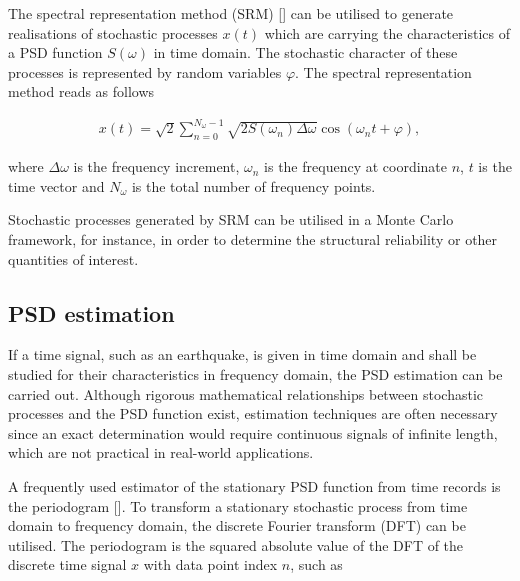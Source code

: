 \label{15268098057762990786}{}


The spectral representation method (SRM) [] can be utilised to generate realisations of stochastic processes \(x(t)\) which are carrying the characteristics of a PSD function \(S(\omega)\) in time domain. The stochastic character of these processes is represented by random variables \(\varphi\). The spectral representation method reads as follows



\begin{equation*}
\begin{split}    x(t) = \sqrt{2} \sum \limits_{n=0}^{N_{\omega}-1}\sqrt{2 S(\omega_n) \Delta \omega} \cos(\omega_n t + \varphi),\end{split}\end{equation*}


where \(\Delta \omega\) is the frequency increment, \(\omega_n\) is the frequency at coordinate \(n\), \(t\) is the time vector and \(N_{\omega}\) is the total number of frequency points.



Stochastic processes generated by SRM can be utilised in a Monte Carlo framework, for instance, in order to determine the structural reliability or other quantities of interest.



\subsection{PSD estimation}



\label{15969932036151766388}{}


If a time signal, such as an earthquake, is given in time domain and shall be studied for their characteristics in frequency domain, the PSD estimation can be carried out. Although rigorous mathematical relationships between stochastic processes and the PSD function exist, estimation techniques are often necessary since an exact determination would require continuous signals of infinite length, which are not practical in real-world applications.



A frequently used estimator of the stationary PSD function from time records is the periodogram []. To transform a stationary stochastic process from time domain to frequency domain, the discrete Fourier transform (DFT) can be utilised. The periodogram is the squared absolute value of the DFT of the discrete time signal \(x\) with data point index \(n\), such as




